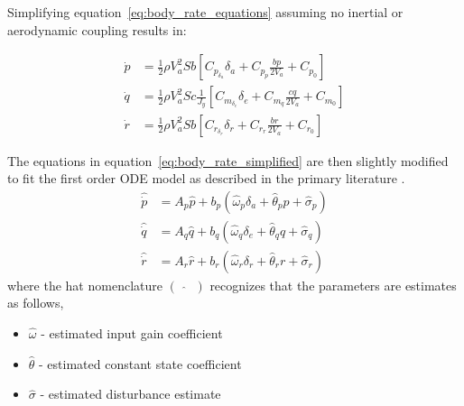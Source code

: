 Simplifying equation~\ref{eq:body_rate_equations} assuming no inertial or aerodynamic coupling results in:

\begin{equation}\label{eq:body_rate_simplified}
\begin{split}
	\dot{p}&=\frac{1}{2}\rho V_a^2Sb\left[C_{p_{\delta_a}}\delta_a+C_{p_p}\frac{bp}{2V_a}+C_{p_0}\right]\\
	\dot{q}&=\frac{1}{2}\rho V_a^2Sc\frac{1}{J_y}\left[C_{m_{\delta_e}}\delta_e+C_{m_q}\frac{cq}{2V_a}+C_{m_0}\right]\\
	\dot{r}&=\frac{1}{2}\rho V_a^2Sb\left[C_{r_{\delta_r}}\delta_r+C_{r_r}\frac{br}{2V_a}+C_{r_0}\right]
\end{split}	
\end{equation}

The equations in equation~\ref{eq:body_rate_simplified} are then slightly modified to fit the first order \ac{ODE} model as described in the primary literature \cite{hovakimyan2010l1}.
\begin{equation}\label{eq:simplified_ac_model}
\begin{split}
\hat{\dot{p}}&=A_p\hat{p}+b_p\left(\hat{\omega}_p\delta_a+\hat{\theta}_pp+\hat{\sigma}_p\right)\\
\hat{\dot{q}}&=A_q\hat{q}+b_q\left(\hat{\omega}_q\delta_e+\hat{\theta}_qq+\hat{\sigma}_q\right)\\
\hat{\dot{r}}&=A_r\hat{r}+b_r\left(\hat{\omega}_r\delta_r+\hat{\theta}_rr+\hat{\sigma}_r\right)
\end{split}
\end{equation}
where the hat nomenclature $(\text{ }\hat{}\text{ })$ recognizes that the parameters are estimates as follows,
\begin{itemize}
	\item[] $\hat{\omega}$ - estimated input gain coefficient
	\item[] $\hat{\theta}$ - estimated constant state coefficient
	\item[] $\hat{\sigma}$ - estimated disturbance estimate
\end{itemize}


